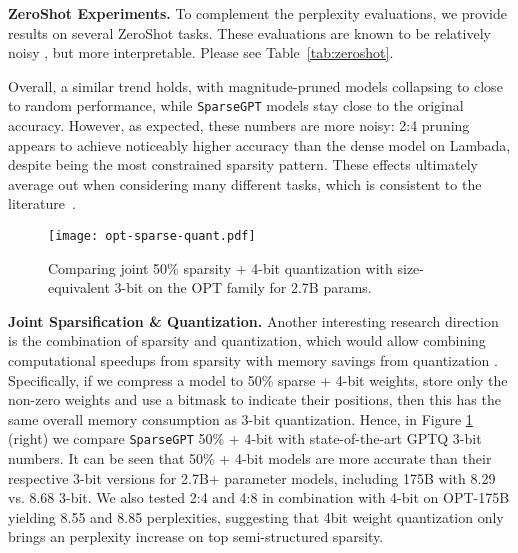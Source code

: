 \documentclass{article}
\theoremstyle{plain}
\theoremstyle{definition}
\theoremstyle{remark}
\renewcommand{\paragraph}[1]{\vspace{-0.1em} \noindent \textbf{#1}}
\newcommand{\sparsegpt}[1]{\texttt{SparseGPT}}
\begin{document}
\paragraph{ZeroShot Experiments.} To complement the perplexity evaluations, we provide results on several ZeroShot tasks. These evaluations are known to be relatively noisy \cite{dettmers2022llm}, but more interpretable. Please see Table~\ref{tab:zeroshot}.

Overall, a similar trend holds, with magnitude-pruned models collapsing to close to random performance, while \sparsegpt{} models stay close to the original accuracy. However, as expected, these numbers are more noisy: 2:4 pruning appears to achieve noticeably higher accuracy than the dense model on Lambada, despite being the most constrained sparsity pattern. These effects ultimately average out when considering many different tasks, which is consistent to the literature~\cite{yao2022zeroquant, dettmers2022llm, dettmers2022case}.

\begin{figure}[h!]
    \centering
    \texttt{[image: opt-sparse-quant.pdf]}
    \vspace{-10pt}
    \caption{Comparing joint 50\% sparsity + 4-bit quantization with size-equivalent 3-bit on the OPT family for  2.7B params.}
    \label{fig:sparse-quantized}
\end{figure}

\paragraph{Joint Sparsification \& Quantization.} Another interesting research direction is the combination of sparsity and quantization, which would allow combining computational speedups from sparsity \cite{pmlr-v119-kurtz20a, elsen2020fast} with memory savings from quantization \cite{frantar2022gptq, dettmers2022llm, dettmers2022case}. Specifically, if we compress a model to 50\% sparse + 4-bit weights, store only the non-zero weights and use a bitmask to indicate their positions, then this has the same overall memory consumption as 3-bit quantization. Hence, in Figure \ref{fig:sparse-quantized} (right) we compare \sparsegpt{} 50\% + 4-bit with state-of-the-art GPTQ \cite{frantar2022gptq} 3-bit numbers. It can be seen that 50\% + 4-bit models are more accurate than their respective 3-bit versions for 2.7B+ parameter models, including 175B with 8.29 vs. 8.68 3-bit. We also tested 2:4 and 4:8 in combination with 4-bit on OPT-175B yielding 8.55 and 8.85 perplexities, suggesting that 4bit weight quantization only brings an  perplexity increase on top semi-structured sparsity.
\end{document}

